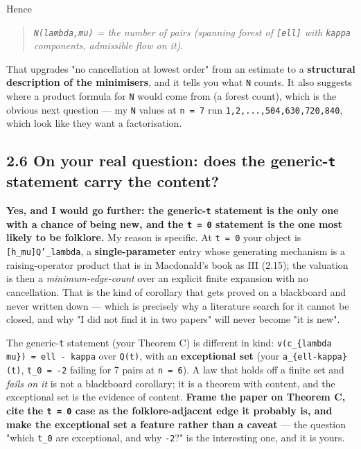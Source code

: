\documentclass[11pt,a4paper]{article}
\begin{document}
Hence

\begin{quote}\itshape \mbox{\texttt{N(lambda,mu)}} = the number of pairs (spanning forest of \mbox{\texttt{[ell]}} with \mbox{\texttt{kappa}} components, admissible flow on it).\end{quote}

That upgrades "no cancellation at lowest order" from an estimate to a \textbf{structural description of the minimisers}, and it tells you what \mbox{\texttt{N}} counts. It also suggests where a product formula for \mbox{\texttt{N}} would come from (a forest count), which is the obvious next question --- my \mbox{\texttt{N}} values at \mbox{\texttt{n = 7}} run \mbox{\texttt{1,2,...,504,630,720,840}}, which look like they want a factorisation.

\subsection*{2.6 On your real question: does the generic-\mbox{\texttt{t}} statement carry the content?}

\textbf{Yes, and I would go further: the generic-\mbox{\texttt{t}} statement is the only one with a chance of being new, and the \mbox{\texttt{t = 0}} statement is the one most likely to be folklore.} My reason is specific. At \mbox{\texttt{t = 0}} your object is \mbox{\texttt{[h\_mu]Q'\_lambda}}, a \textbf{single-parameter} entry whose generating mechanism is a raising-operator product that is in Macdonald's book as III (2.15); the valuation is then a \emph{minimum-edge-count} over an explicit finite expansion with no cancellation. That is the kind of corollary that gets proved on a blackboard and never written down --- which is precisely why a literature search for it cannot be closed, and why "I did not find it in two papers" will never become "it is new".

The generic-\mbox{\texttt{t}} statement (your Theorem C) is different in kind: \mbox{\texttt{v(c\_\{lambda mu\}) = ell - kappa}} over \mbox{\texttt{Q(t)}}, with an \textbf{exceptional set} (your \mbox{\texttt{a\_\{ell-kappa\}(t)}}, \mbox{\texttt{t\_0 = -2}} failing for 7 pairs at \mbox{\texttt{n = 6}}). A law that holds off a finite set and \emph{fails on it} is not a blackboard corollary; it is a theorem with content, and the exceptional set is the evidence of content. \textbf{Frame the paper on Theorem C, cite the \mbox{\texttt{t = 0}} case as the folklore-adjacent edge it probably is, and make the exceptional set a feature rather than a caveat} --- the question "which \mbox{\texttt{t\_0}} are exceptional, and why \mbox{\texttt{-2}}?" is the interesting one, and it is yours.
\end{document}
